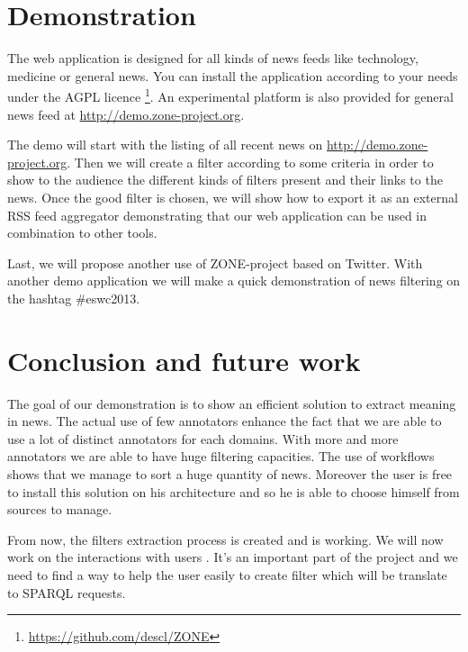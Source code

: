 \documentclass{llncs}
\begin{document}
\section{Demonstration}
%

The web application is designed for all kinds of news feeds like technology, medicine or general news. You can install the application according to your needs under the AGPL licence \footnote{\url{https://github.com/descl/ZONE}}. An experimental platform is also provided for general news feed at \url{http://demo.zone-project.org}.


The demo will start with the listing of all recent news on \url{http://demo.zone-project.org}. Then we will create a filter according to some criteria in order to show to the audience the different kinds of filters present and their links to the news. Once the good filter is chosen, we will show how to export it as an external RSS feed aggregator demonstrating that our web application can be used in combination to other tools.

Last, we will propose another use of ZONE-project based on Twitter. With another demo application we will make a quick demonstration of news filtering on the hashtag \#eswc2013.

\section{Conclusion and future work}
%
The goal of our demonstration is to show an efficient solution to extract meaning in news. The actual use of few annotators enhance the fact that we are able to use a lot of distinct annotators for each domains. With more and more annotators we are able to have huge filtering capacities. The use of workflows shows that we manage to sort a huge quantity of news. Moreover the user is free to install this solution on his architecture and so he is able to choose himself from sources to manage.

From now, the filters extraction process is created and is working. We will now work on the interactions with users . It's an important part of the project and we need to find a way to help the user easily to create filter which will be translate to SPARQL requests.
\end{document}
